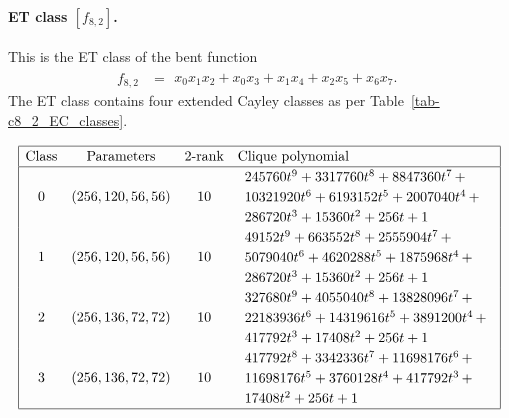 %
\paragraph*{ET class $[f_{8,2}]$.}
%
This is the ET class of the bent function
\small{}
\begin{align*}
f_{ 8 , 2 } &=
\begin{array}{l}
x_{0} x_{1} x_{2} + x_{0} x_{3} + x_{1} x_{4} + x_{2} x_{5} + x_{6} x_{7}.
\end{array}
\end{align*}
\normalsize{}
The ET class contains four extended Cayley classes as per Table~\ref{tab-c8_2_EC_classes}.

\begin{table}[!bhpt] %
\small{}
\begin{align*}
\def\arraystretch{1.2}
\begin{array}{|cccl|}
\hline
\text{Class} &
\text{Parameters} &
\text{2-rank} &
\text{Clique polynomial}
\\
\hline
0 &
(256, 120, 56, 56) &
10 &
\begin{array}{l}
245760t^{9} + 3317760t^{8} + 8847360t^{7}
\,+
\\
 10321920t^{6} + 6193152t^{5} + 2007040t^{4}
\,+
\\
 286720t^{3} + 15360t^{2} + 256t + 1
\end{array}
\\
1 &
(256, 120, 56, 56) &
10 &
\begin{array}{l}
49152t^{9} + 663552t^{8} + 2555904t^{7}
\,+
\\
 5079040t^{6} + 4620288t^{5} + 1875968t^{4}
\,+
\\
 286720t^{3} + 15360t^{2} + 256t + 1
\end{array}
\\
2 &
(256, 136, 72, 72) &
10 &
\begin{array}{l}
327680t^{9} + 4055040t^{8} + 13828096t^{7}
\,+
\\
 22183936t^{6} + 14319616t^{5} + 3891200t^{4}
\,+
\\
 417792t^{3} + 17408t^{2} + 256t + 1
\end{array}
\\
3 &
(256, 136, 72, 72) &
10 &
\begin{array}{l}
417792t^{8} + 3342336t^{7} + 11698176t^{6}
\,+
\\
 11698176t^{5} + 3760128t^{4} + 417792t^{3}
\,+
\\
 17408t^{2} + 256t + 1
\end{array}
\\
\hline
\end{array}
\end{align*}
\caption{$[f_{8,2}]$ extended Cayley classes.}
\label{tab-c8_2_EC_classes}
\end{table}

